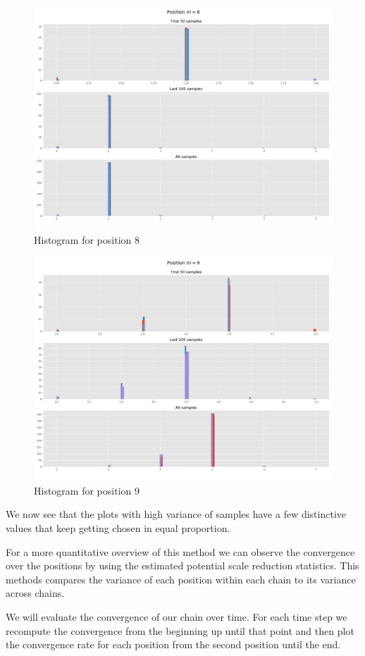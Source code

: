 \documentclass[]{article}
\begin{document}
	\begin{figure}[H]
		\begin{center}
			
			\includegraphics[width=.5\textwidth]{task4/figures/T_2_4/Q2/distribution_pos8.png}
			\caption*{Histogram for position 8}
		\end{center}
	\end{figure}
	
	\begin{figure}[H]
		\begin{center}
			
			\includegraphics[width=.5\textwidth]{task4/figures/T_2_4/Q2/distribution_pos9.png}
			\caption*{Histogram for position 9}
		\end{center}
	\end{figure}
	
	We now see that the plots with high variance of samples have a few distinctive values that keep getting chosen in equal proportion.
	
	For a more quantitative overview of this method we can observe the convergence over the positions by using the estimated potential scale reduction statistics. This methods compares the variance of each position within each chain to its variance across chains.
	
	We will evaluate the convergence of our chain over time. For each time step we recompute the convergence from the beginning up until that point and then plot the convergence rate for each position from the second position until the end.
	
\end{document}
